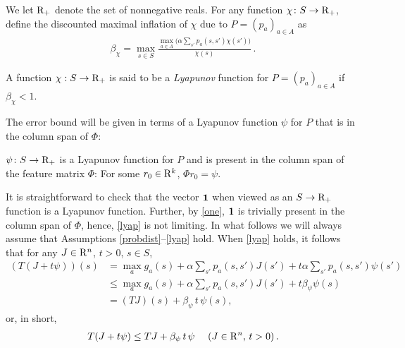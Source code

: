 We let $\mathrm{R}_+$ denote the set of nonnegative reals. 
For any function $\chi\colon S\rightarrow \mathrm{R}_+$, define the discounted maximal inflation of $\chi$ due to $P = (p_a)_{a\in A}$ as
\begin{align*}
\beta_{\chi}=\max_{s \in S} \frac{\underset{a \in A}{\max}\big(\alpha\sum_{s'}p_a(s,s')\chi(s')\big)}{\chi(s)}\,.
\end{align*}
\begin{definition}
A function $\chi:S\to\mathrm{R}_+$ is said to be a \emph{Lyapunov} function for $P = (p_a)_{a\in A}$ 
	if $\beta_{\chi}<1$.
\end{definition}
The error bound will be given in terms of a Lyapunov function $\psi$ for $P$ that is in the column span of $\Phi$:
\begin{assumption}\label{lyap}
$\psi\colon S \rightarrow \mathrm{R}_+$ is a Lyapunov function for $P$
and is present in the column span of the feature matrix $\Phi$: For some $r_0\in \mathrm{R}^k$, $\Phi r_0 = \psi$.
\end{assumption}
It is straightforward to check that the vector $\mathbf{1}$ when viewed as an $S \to \mathrm{R}_+$ function 
is a Lyapunov function. 
Further, by \cref{one}, $\mathbf{1}$ is trivially present in the column span of $\Phi$, 
hence, \cref{lyap} is not limiting.
In what follows we will always assume that Assumptions \ref{probdist}--\ref{lyap} hold. 
When \cref{lyap} holds, it follows that for any $J\in \mathrm{R}^n$, $t>0$, $s\in S$,
\begin{align*}
(T(J+ t \psi))(s) &= 
\max_{a} g_a(s) + \alpha \sum_{s'} p_a(s,s') J(s') + t \alpha  \sum_{s'} p_a(s,s') \psi(s') \\
& \le 
\max_{a} g_a(s) + \alpha \sum_{s'} p_a(s,s') J(s') + t \beta_{\psi} \psi(s) \\
& = (T J)(s) + \beta_{\psi}\,t\,  \psi(s),
\end{align*}
or, in short,
\begin{align}
\label{eq:psilin}
T(J+ t \psi ) \le TJ + \beta_{\psi}\,t\,  \psi\,\, \quad (J\in \R^n,\, t>0)\,.
\end{align}

